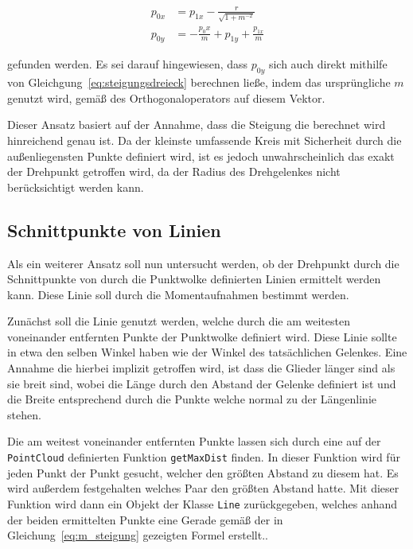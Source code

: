\begin{equation}
    \begin{split}
        p_{0x} &= p_{1x} - \frac{r}{\sqrt{1 + m^{-2}}} \\
        p_{0y} &= - \frac{p_0x}{m} + p_{1y} + \frac{p_{1x}}{m}
    \end{split}
\end{equation}

gefunden werden.
Es sei darauf hingewiesen, dass $p_{0y}$ sich auch direkt mithilfe von Gleichgung~\ref{eq:steigungsdreieck} berechnen ließe, indem das ursprüngliche $m$ genutzt wird, gemäß des Orthogonaloperators auf diesem Vektor.

Dieser Ansatz basiert auf der Annahme, dass die Steigung die berechnet wird hinreichend genau ist.
Da der kleinste umfassende Kreis mit Sicherheit durch die außenliegensten Punkte definiert wird, ist es jedoch unwahrscheinlich das exakt der Drehpunkt getroffen wird, da der Radius des Drehgelenkes nicht berücksichtigt werden kann.



\subsection{Schnittpunkte von Linien}

Als ein weiterer Ansatz soll nun untersucht werden, ob der Drehpunkt durch die Schnittpunkte von durch die Punktwolke definierten Linien ermittelt werden kann.
Diese Linie soll durch die Momentaufnahmen bestimmt werden.

Zunächst soll die Linie genutzt werden, welche durch die am weitesten voneinander entfernten Punkte der Punktwolke definiert wird.
Diese Linie sollte in etwa den selben Winkel haben wie der Winkel des tatsächlichen Gelenkes.
Eine Annahme die hierbei implizit getroffen wird, ist dass die Glieder länger sind als sie breit sind, wobei die Länge durch den Abstand der Gelenke definiert ist und die Breite entsprechend durch die Punkte welche normal zu der Längenlinie stehen.

Die am weitest voneinander entfernten Punkte lassen sich durch eine auf der \lstinline{PointCloud} definierten Funktion \lstinline{getMaxDist} finden.
In dieser Funktion wird für jeden Punkt der Punkt gesucht, welcher den größten Abstand zu diesem hat. Es wird außerdem festgehalten welches Paar den größten Abstand hatte.
Mit dieser Funktion wird dann ein Objekt der Klasse \lstinline{Line} zurückgegeben, welches anhand der beiden ermittelten Punkte eine Gerade gemäß der in Gleichung~\ref{eq:m_steigung} gezeigten Formel erstellt..

